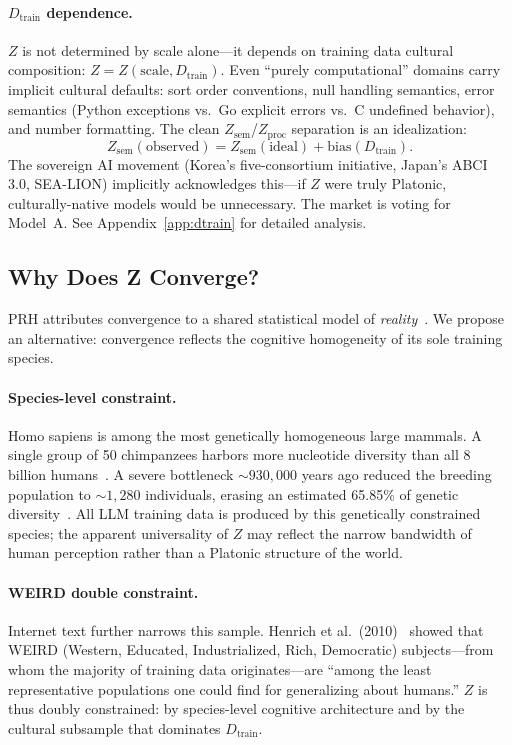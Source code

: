 \documentclass{article}
\theoremstyle{definition}
\newcommand{\Zsem}{Z_{\text{sem}}}
\newcommand{\Zproc}{Z_{\text{proc}}}
\newcommand{\Dtrain}{D_{\text{train}}}
\begin{document}
\paragraph{$\Dtrain$ dependence.}
$Z$ is not determined by scale alone---it depends on training data cultural composition: $Z = Z(\text{scale}, \Dtrain)$. Even ``purely computational'' domains carry implicit cultural defaults: sort order conventions, null handling semantics, error semantics (Python exceptions vs.\ Go explicit errors vs.\ C undefined behavior), and number formatting. The clean $\Zsem$/$\Zproc$ separation is an idealization:
\[
\Zsem(\text{observed}) = \Zsem(\text{ideal}) + \mathrm{bias}(\Dtrain).
\]
The sovereign AI movement (Korea's five-consortium initiative, Japan's ABCI 3.0, SEA-LION) implicitly acknowledges this---if $Z$ were truly Platonic, culturally-native models would be unnecessary. The market is voting for Model~A. See Appendix~\ref{app:dtrain} for detailed analysis.

\subsection{Why Does Z Converge?}\label{sec:whydoes}

PRH attributes convergence to a shared statistical model of \emph{reality}~\citep{huh2024platonic}. We propose an alternative: convergence reflects the cognitive homogeneity of its sole training species.

\paragraph{Species-level constraint.}
Homo sapiens is among the most genetically homogeneous large mammals. A single group of 50 chimpanzees harbors more nucleotide diversity than all 8 billion humans~\citep{pradomartinez2013apes}. A severe bottleneck ${\sim}930{,}000$ years ago reduced the breeding population to ${\sim}1{,}280$ individuals, erasing an estimated 65.85\% of genetic diversity~\citep{hu2023bottleneck}. All LLM training data is produced by this genetically constrained species; the apparent universality of $Z$ may reflect the narrow bandwidth of human perception rather than a Platonic structure of the world.

\paragraph{WEIRD double constraint.}
Internet text further narrows this sample. Henrich et al.\ (2010)~\citep{henrich2010weird} showed that WEIRD (Western, Educated, Industrialized, Rich, Democratic) subjects---from whom the majority of training data originates---are ``among the least representative populations one could find for generalizing about humans.'' $Z$ is thus doubly constrained: by species-level cognitive architecture and by the cultural subsample that dominates $\Dtrain$.
\end{document}
